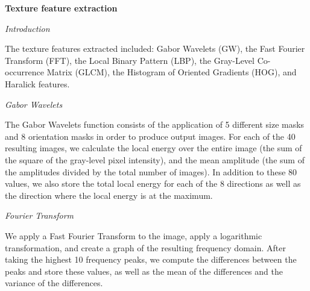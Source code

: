 \textbf{Texture feature extraction}


    \textit{Introduction}
    
The texture features extracted included: Gabor Wavelets (GW), the Fast Fourier Transform (FFT), the Local Binary Pattern (LBP), the Gray-Level Co-occurrence Matrix (GLCM), the Histogram of Oriented Gradients (HOG), and Haralick features.

    \textit{Gabor Wavelets}

The Gabor Wavelets function consists of the application of 5 different size masks and 8 orientation masks in order to produce output images. For each of the 40 resulting images, we calculate the local energy over the entire image (the sum of the square of the gray-level pixel intensity), and the mean amplitude (the sum of the amplitudes divided by the total number of images). In addition to these 80 values, we also store the total local energy for each of the 8 directions as well as the direction where the local energy is at the maximum.

    \textit{Fourier Transform}

We apply a Fast Fourier Transform to the image, apply a logarithmic transformation, and create a graph of the resulting frequency domain. After taking the highest 10 frequency peaks, we compute the differences between the peaks and store these values, as well as the mean of the differences and the variance of the differences. 

    
    
    
    
    
  
  